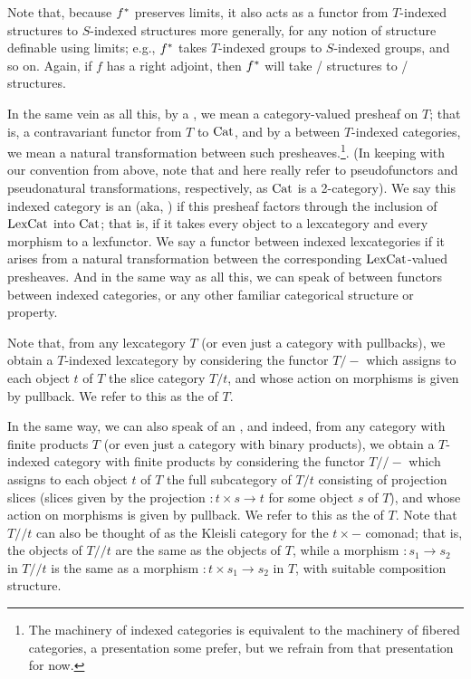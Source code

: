 Note that, because $f^*$ preserves limits, it also acts as a functor from $T$-indexed structures to $S$-indexed structures more generally, for any notion of structure definable using limits; e.g., $f^*$ takes $T$-indexed groups to $S$-indexed groups, and so on. Again, if $f$ has a right adjoint, then $f^*$ will take \repsmall/ structures to \repsmall/ structures.

In the same vein as all this, by a , we mean a category-valued presheaf on $T$; that is, a contravariant functor from $T$ to $\mathrm{Cat}$, and by a  between $T$-indexed categories, we mean a natural transformation between such presheaves.\footnote{The machinery of indexed categories is equivalent to the machinery of fibered categories, a presentation some prefer, but we refrain from that presentation for now.}. (In keeping with our convention from above, note that  and  here really refer to pseudofunctors and pseudonatural transformations, respectively, as $\mathrm{Cat}$ is a 2-category). We say this indexed category is an  (aka, ) if this presheaf factors through the inclusion of $\mathrm{LexCat}$ into $\mathrm{Cat}$; that is, if it takes every object to a lexcategory and every morphism to a lexfunctor. We say a functor between indexed lexcategories  if it arises from a natural transformation between the corresponding $\mathrm{LexCat}$-valued presheaves. And in the same way as all this, we can speak of  between functors between indexed categories, or any other familiar categorical structure or property.

Note that, from any lexcategory $T$ (or even just a category with pullbacks), we obtain a $T$-indexed lexcategory by considering the functor $T/-$ which assigns to each object $t$ of $T$ the slice category $T/t$, and whose action on morphisms is given by pullback. We refer to this as the  of $T$.

In the same way, we can also speak of an , and indeed, from any category with finite products $T$ (or even just a category with binary products), we obtain a $T$-indexed category with finite products by considering the functor $T//-$ which assigns to each object $t$ of $T$ the full subcategory of $T/t$ consisting of projection slices (slices given by the projection $: t \times s \to t$ for some object $s$ of $T$), and whose action on morphisms is given by pullback. We refer to this as the  of $T$. Note that $T//t$ can also be thought of as the Kleisli category for the $t \times -$ comonad; that is, the objects of $T//t$ are the same as the objects of $T$, while a morphism $: s_1 \to s_2$ in $T//t$ is the same as a morphism $: t \times s_1 \to s_2$ in $T$, with suitable composition structure.

